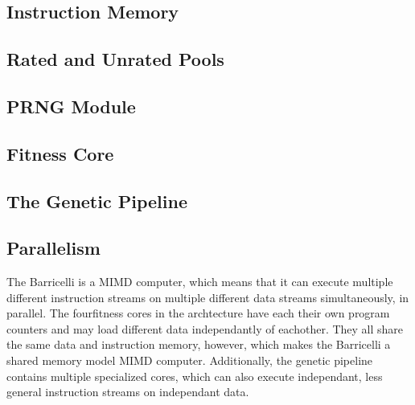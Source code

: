 \subsection{Instruction Memory}


\subsection{Rated and Unrated Pools}


\subsection{PRNG Module}
    
 

\subsection{Fitness Core} \label{fpga:fitness:ss:design_of_the_fitness_core}
     \label{fpga:subsection:fitness_core}


\subsection{The Genetic Pipeline}


\subsection{Parallelism}
The Barricelli is a MIMD computer, which means that it can execute multiple different instruction streams on multiple different data streams simultaneously, in parallel.
The four\cn fitness cores in the archtecture have each their own program counters and may load different data independantly of eachother.
They all share the same data and instruction memory, however, which makes the Barricelli a shared memory model MIMD computer.
Additionally, the genetic pipeline contains multiple specialized cores, which can also execute independant, less general instruction streams on independant data.

